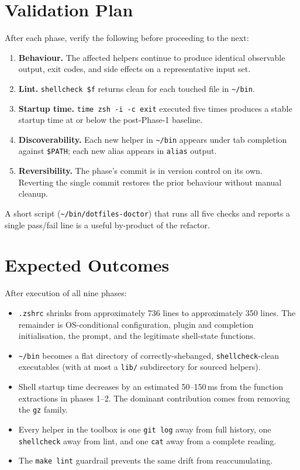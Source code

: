 \documentclass[11pt,letterpaper]{scrartcl}
\begin{document}
\section{Validation Plan}

After each phase, verify the following before proceeding to the
next:

\begin{enumerate}
  \item \textbf{Behaviour.} The affected helpers continue to
        produce identical observable output, exit codes, and
        side effects on a representative input set.
  \item \textbf{Lint.} \texttt{shellcheck \$f} returns clean for
        each touched file in \texttt{\textasciitilde/bin}.
  \item \textbf{Startup time.} \texttt{time zsh -i -c exit}
        executed five times produces a stable startup time at or
        below the post-Phase-1 baseline.
  \item \textbf{Discoverability.} Each new helper in
        \texttt{\textasciitilde/bin} appears under tab completion
        against \texttt{\$PATH}; each new alias appears in
        \texttt{alias} output.
  \item \textbf{Reversibility.} The phase's commit is in version
        control on its own. Reverting the single commit restores
        the prior behaviour without manual cleanup.
\end{enumerate}

A short script (\texttt{\textasciitilde/bin/dotfiles-doctor})
that runs all five checks and reports a single pass/fail line
is a useful by-product of the refactor.

\section{Expected Outcomes}

After execution of all nine phases:

\begin{itemize}
  \item \texttt{.zshrc} shrinks from approximately 736 lines to
        approximately 350 lines. The remainder is OS-conditional
        configuration, plugin and completion initialisation, the
        prompt, and the legitimate shell-state functions.
  \item \texttt{\textasciitilde/bin} becomes a flat directory of
        correctly-shebanged, \texttt{shellcheck}-clean
        executables (with at most a \texttt{lib/} subdirectory
        for sourced helpers).
  \item Shell startup time decreases by an estimated 50--150\,ms
        from the function extractions in phases 1--2. The
        dominant contribution comes from removing the \texttt{gz}
        family.
  \item Every helper in the toolbox is one \texttt{git log} away
        from full history, one \texttt{shellcheck} away from
        lint, and one \texttt{cat} away from a complete reading.
  \item The \texttt{make lint} guardrail prevents the same
        drift from reaccumulating.
\end{itemize}
\end{document}
